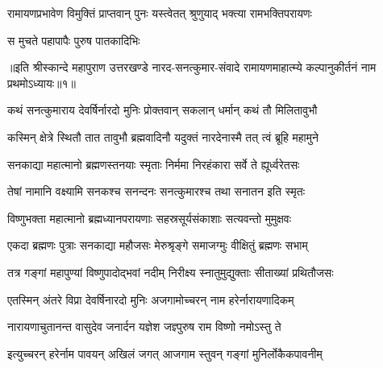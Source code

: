  

\twolineshloka
{रामायणप्रभावेण विमुक्तिं प्राप्तवान् पुनः}
{यस्त्वेतत् श्रुणुयाद् भक्त्या रामभक्तिपरायणः}%

 
\onelineshloka
{स मुचते पहापापैः पुरुष पातकादिभिः}%

॥इति श्रीस्कान्दे महापुराण उत्तरखण्डे नारद-सनत्कुमार-संवादे रामायणमाहात्म्ये कल्पानुकीर्तनं नाम प्रथमोऽध्यायः॥१॥
 

 

 


\twolineshloka
{कथं सनत्कुमाराय देवर्षिर्नारदो मुनिः}
{प्रोक्तवान् सकलान् धर्मान् कथं तौ मिलितावुभौ}%

 

\twolineshloka
{कस्मिन् क्षेत्रे स्थितौ तात तावुभौ ब्रह्मवादिनौ}
{यदुक्तं नारदेनास्मै तत् त्वं ब्रूहि महामुने}%

 


\twolineshloka
{सनकाद्या महात्मानो ब्रह्मणस्तनयाः स्मृताः}
{निर्ममा निरहंकारा सर्वे ते ह्यूर्ध्वरेतसः}%

 

\twolineshloka
{तेषां नामानि वक्ष्यामि सनकश्च सनन्दनः}
{सनत्कुमारश्च तथा सनातन इति स्मृतः}%

 

\twolineshloka
{विष्णुभक्ता महात्मानो ब्रह्मध्यानपरायणाः}
{सहस्रसूर्यसंकाशाः सत्यवन्तो मुमुक्षवः}%

 

\twolineshloka
{एकदा ब्रह्मणः पुत्राः सनकाद्या महौजसः}
{मेरुश्रृङ्‍गे समाजग्मुः वीक्षितुं ब्रह्मणः सभाम्}%

 

\twolineshloka
{तत्र गङ्‍गां महापुण्यां विष्णुपादोद्‌भवां नदीम्}
{निरीक्ष्य स्नातुमुद्युक्ताः सीताख्यां प्रथितौजसः}%

 

\twolineshloka
{एतस्मिन् अंतरे विप्रा देवर्षिनारदो मुनिः}
{अजगामोच्चरन् नाम हरेर्नारायणादिकम्}%

 

\twolineshloka
{नारायणाचुतानन्त वासुदेव जनार्दन}
{यज्ञेश जज्ञ्पुरुष राम विष्णो नमोऽस्तु ते}%

 

\twolineshloka
{इत्युच्चरन् हरेर्नाम पावयन् अखिलं जगत्}
{आजगाम स्तुवन् गङ्गां मुनिर्लोकैकपावनीम्}%

 

